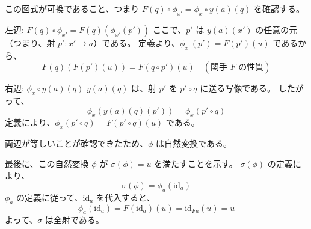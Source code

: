 \documentclass[uplatex,a4j,12pt,dvipdfmx]{jsarticle}
\begin{document}
この図式が可換であること、つまり $F(q) \circ \phi_{x'} = \phi_x \circ y(a)(q)$ を確認する。

左辺: $F(q) \circ \phi_{x'} = F(q)(\phi_{x'}(p'))$
ここで、$p'$ は $y(a)(x')$ の任意の元（つまり、射 $p': x' \to a$）である。
定義より、$\phi_{x'}(p') = F(p')(u)$ であるから、
$$ F(q)(F(p')(u)) = F(q \circ p')(u) \quad (\text{関手 } F \text{ の性質}) $$

右辺: $\phi_x \circ y(a)(q)$
$y(a)(q)$ は、射 $p'$ を $p' \circ q$ に送る写像である。
したがって、
$$ \phi_x(y(a)(q)(p')) = \phi_x(p' \circ q) $$
定義により、$\phi_x(p' \circ q) = F(p' \circ q)(u)$ である。

両辺が等しいことが確認できたため、$\phi$ は自然変換である。

最後に、この自然変換 $\phi$ が $\sigma(\phi) = u$ を満たすことを示す。
$\sigma(\phi)$ の定義により、
$$ \sigma(\phi) = \phi_a(\text{id}_a) $$
$\phi_a$ の定義に従って、$\text{id}_a$ を代入すると、
$$ \phi_a(\text{id}_a) = F(\text{id}_a)(u) = \text{id}_{Fa}(u) = u $$
よって、$\sigma$ は全射である。
\end{document}
